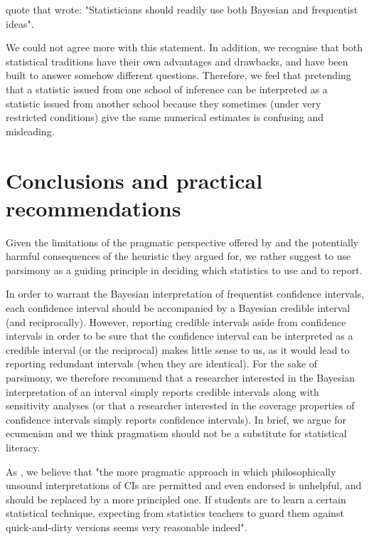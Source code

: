 \documentclass[a4paper,man,natbib,floatsintext,donotrepeattitle]{apa6}
\begin{document}
\cite{albers_credible_2018} quote \cite{bayarri_interplay_2004} that wrote: "Statisticians should readily use both Bayesian and frequentist ideas".

We could not agree more with this statement. In addition, we recognise that both statistical traditions have their own advantages and drawbacks, and have been built to answer somehow different questions. Therefore, we feel that pretending that a statistic issued from one school of inference can be interpreted as a statistic issued from another school because they sometimes (under very restricted conditions) give the same numerical estimates is confusing and misleading.

\section{Conclusions and practical recommendations}

Given the limitations of the pragmatic perspective offered by \cite{albers_credible_2018} and the potentially harmful consequences of the heuristic they argued for, we rather suggest to use parsimony as a guiding principle in deciding which statistics to use and to report.

In order to warrant the Bayesian interpretation of frequentist confidence intervals, each confidence interval should be accompanied by a Bayesian credible interval (and reciprocally). However, reporting credible intervals aside from confidence intervals in order to be sure that the confidence interval can be interpreted as a credible interval (or the reciprocal) makes little sense to us, as it would lead to reporting redundant intervals (when they are identical). For the sake of parsimony, we therefore recommend that a researcher interested in the Bayesian interpretation of an interval simply reports credible intervals along with sensitivity analyses (or that a researcher interested in the coverage properties of confidence intervals simply reports confidence intervals). In brief, we argue for ecumenism and we think pragmatism should not be a substitute for statistical literacy. 

As \cite{hoekstra_improving_2018}, we believe that "the more pragmatic approach in which philosophically unsound interpretations of CIs are permitted and even endorsed is unhelpful, and should be replaced by a more principled one. If students are to learn a certain statistical technique, expecting from statistics teachers to guard them against quick-and-dirty versions seems very reasonable indeed".
\end{document}
